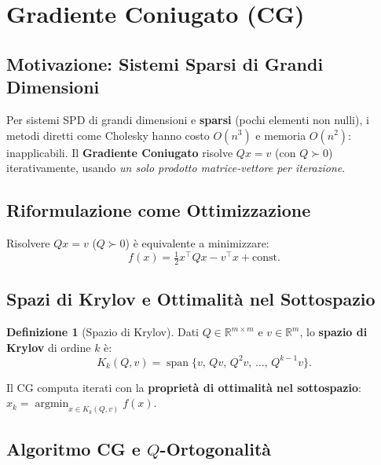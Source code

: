 \documentclass[11pt,a4paper]{article}
\theoremstyle{definition}
\newtheorem{definition}{Definizione}[section]
\theoremstyle{plain}
\theoremstyle{remark}
\newcommand{\R}{\mathbb{R}}
\newcommand{\T}{^{\top}}
\newcommand{\argmin}{\operatorname*{argmin}}
\begin{document}
\section{Gradiente Coniugato (CG)}
\label{sec:cg}

\subsection{Motivazione: Sistemi Sparsi di Grandi Dimensioni}

Per sistemi SPD di grandi dimensioni e \textbf{sparsi} (pochi elementi non nulli), i metodi diretti
come Cholesky hanno costo $O(n^3)$ e memoria $O(n^2)$: inapplicabili.
Il \textbf{Gradiente Coniugato} risolve $Qx = v$ (con $Q \succ 0$) iterativamente,
usando \emph{un solo prodotto matrice-vettore per iterazione}.

\subsection{Riformulazione come Ottimizzazione}

Risolvere $Qx = v$ ($Q \succ 0$) è equivalente a minimizzare:
\[
  f(x) = \tfrac{1}{2} x\T Q x - v\T x + \text{const}.
\]

\subsection{Spazi di Krylov e Ottimalità nel Sottospazio}

\begin{definition}[Spazio di Krylov]
  Dati $Q \in \R^{m \times m}$ e $v \in \R^m$, lo \textbf{spazio di Krylov} di ordine $k$ è:
  \[
    K_k(Q, v) = \operatorname{span}\{v,\, Qv,\, Q^2v,\, \ldots,\, Q^{k-1}v\}.
  \]
\end{definition}

Il CG computa iterati con la \textbf{proprietà di ottimalità nel sottospazio}:
$x_k = \argmin_{x \in K_k(Q,v)} f(x)$.

\subsection{Algoritmo CG e $Q$-Ortogonalità}
\end{document}
